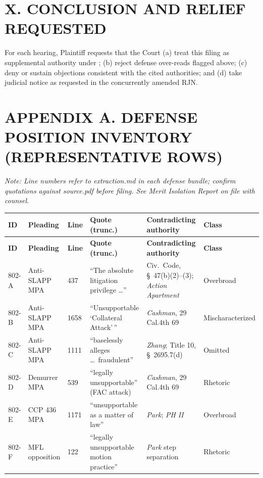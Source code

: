 \section*{X. CONCLUSION AND RELIEF REQUESTED}

For each hearing, Plaintiff requests that the Court (a) treat this filing as supplemental authority under ; (b) reject defense over-reads flagged above; (c) deny or sustain objections consistent with the cited authorities; and (d) take judicial notice as requested in the concurrently amended RJN.

\appendix
\section*{APPENDIX A. DEFENSE POSITION INVENTORY (REPRESENTATIVE ROWS)}

\footnotesize
\noindent\textit{Note: Line numbers refer to extraction.md in each defense bundle; confirm quotations against source.pdf before filing. See Merit Isolation Report on file with counsel.}

\begin{longtable}{@{}p{0.35in}p{0.9in}p{0.55in}p{1.35in}p{1.35in}p{0.45in}@{}}
\toprule
\textbf{ID} & \textbf{Pleading} & \textbf{Line} & \textbf{Quote (trunc.)} & \textbf{Contradicting authority} & \textbf{Class} \\
\midrule
\endfirsthead
\toprule
\textbf{ID} & \textbf{Pleading} & \textbf{Line} & \textbf{Quote (trunc.)} & \textbf{Contradicting authority} & \textbf{Class} \\
\midrule
\endhead
802-A & Anti-SLAPP MPA & 437 & ``The absolute litigation privilege \dots'' & Civ.\ Code, \S~47(b)(2)--(3); \textit{Action Apartment} & Overbroad \\
802-B & Anti-SLAPP MPA & 1658 & ``Unsupportable `Collateral Attack'\,'' & \textit{Cashman}, 29 Cal.4th 69 & Mischaracterized \\
802-C & Anti-SLAPP MPA & 1111 & ``baselessly alleges \dots\ fraudulent'' & \textit{Zhang}; Title 10, \S~2695.7(d) & Omitted \\
802-D & Demurrer MPA & 539 & ``legally unsupportable'' (FAC attack) & \textit{Cashman}, 29 Cal.4th 69 & Rhetoric \\
802-E & CCP 436 MPA & 1171 & ``unsupportable as a matter of law'' & \textit{Park}; \textit{PH II} & Overbroad \\
802-F & MFL opposition & 122 & ``legally unsupportable motion practice'' & \textit{Park} step separation & Rhetoric \\
\bottomrule
\end{longtable}

